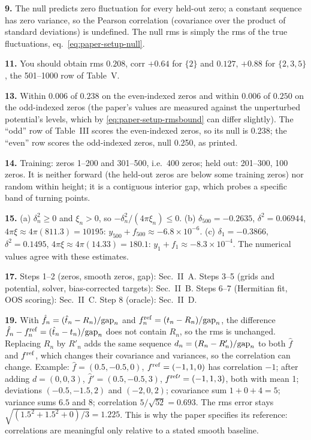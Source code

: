 \textbf{9.} The null predicts zero fluctuation for every held-out zero; a constant sequence has zero variance, so the Pearson correlation (covariance over the product of standard deviations) is undefined. The null rms is simply the rms of the true fluctuations, eq.~\eqref{eq:paper-setup-null}.

\textbf{11.} You should obtain rms $0.208$, corr $+0.64$ for $\{2\}$ and $0.127$, $+0.88$ for $\{2,3,5\}$, the 501--1000 row of Table~V.

\textbf{13.} Within $0.006$ of $0.238$ on the even-indexed zeros and within $0.006$ of $0.250$ on the odd-indexed zeros (the paper's values are measured against the unperturbed potential's levels, which by \eqref{eq:paper-setup-rmsbound} can differ slightly). The ``odd'' row of Table~III scores the even-indexed zeros, so its null is 0.238; the ``even'' row scores the odd-indexed zeros, null 0.250, as printed.

\textbf{14.} Training: zeros 1--200 and 301--500, i.e.\ 400 zeros; held out: 201--300, 100 zeros. It is neither forward (the held-out zeros are below some training zeros) nor random within height; it is a contiguous interior gap, which probes a specific band of turning points.

\textbf{15.} (a) $\delta_n^2\ge0$ and $\xi_n>0$, so $-\delta_n^2/(4\pi\xi_n)\le0$. (b) $\delta_{500}=-0.2635$, $\delta^2=0.06944$, $4\pi\xi\approx4\pi(811.3)=10195$: $y_{500}+f_{500}\approx-6.8\times10^{-6}$. (c) $\delta_1=-0.3866$, $\delta^2=0.1495$, $4\pi\xi\approx4\pi(14.33)=180.1$: $y_1+f_1\approx-8.3\times10^{-4}$. The numerical values agree with these estimates.

\textbf{17.} Steps 1--2 (zeros, smooth zeros, gap): Sec.~II~A. Steps 3--5 (grids and potential, solver, bias-corrected targets): Sec.~II~B. Steps 6--7 (Hermitian fit, OOS scoring): Sec.~II~C. Step 8 (oracle): Sec.~II~D.

\textbf{19.} With $\hat f_n=(\hat t_n-R_n)/\mathrm{gap}_n$ and $f^{\rm ref}_n=(t_n-R_n)/\mathrm{gap}_n$, the difference $\hat f_n-f^{\rm ref}_n=(\hat t_n-t_n)/\mathrm{gap}_n$ does not contain $R_n$, so the rms is unchanged. Replacing $R_n$ by $R'_n$ adds the same sequence $d_n=(R_n-R'_n)/\mathrm{gap}_n$ to both $\hat f$ and $f^{\rm ref}$, which changes their covariance and variances, so the correlation can change. Example: $\hat f=(0.5,-0.5,0)$, $f^{\rm ref}=(-1,1,0)$ has correlation $-1$; after adding $d=(0,0,3)$, $\hat f'=(0.5,-0.5,3)$, $f^{\rm ref\prime}=(-1,1,3)$, both with mean 1; deviations $(-0.5,-1.5,2)$ and $(-2,0,2)$; covariance sum $1+0+4=5$; variance sums $6.5$ and $8$; correlation $5/\sqrt{52}=0.693$. The rms error stays $\sqrt{(1.5^2+1.5^2+0)/3}=1.225$. This is why the paper specifies its reference: correlations are meaningful only relative to a stated smooth baseline.

